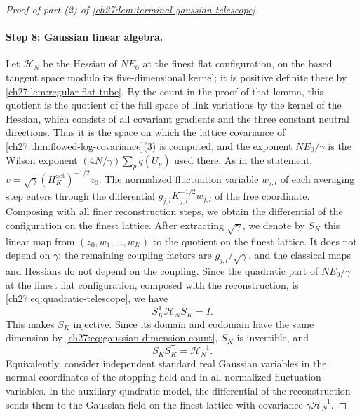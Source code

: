 \begin{proof}[Proof of part (2) of \cref{ch27:lem:terminal-gaussian-telescope}]
\paragraph{Step 8: Gaussian linear algebra.}
Let $\mathcal H_N$ be the Hessian of $NE_0$ at the finest flat configuration, on the based tangent space modulo its five-dimensional kernel; it is positive definite there by \cref{ch27:lem:regular-flat-tube}. By the count in the proof of that lemma, this quotient is the quotient of the full space of link variations by the kernel of the Hessian, which consists of all covariant gradients and the three constant neutral directions. Thus it is the space on which the lattice covariance of \cref{ch27:thm:flowed-log-covariance}(3) is computed, and the exponent $NE_0/\gamma$ is the Wilson exponent $(4N/\gamma)\sum_pq(U_p)$ used there. As in the statement, $v=\sqrt\gamma(H_K^{\mathrm{act}})^{-1/2}z_0$. The normalized fluctuation variable $w_{j,l}$ of each averaging step enters through the differential $g_{j,l}K_{j,l}^{-1/2}w_{j,l}$ of the free coordinate. Composing with all finer reconstruction steps, we obtain the differential of the configuration on the finest lattice. After extracting $\sqrt\gamma$, we denote by $S_K$ this linear map from $(z_0,w_1,\dots,w_K)$ to the quotient on the finest lattice. It does not depend on $\gamma$: the remaining coupling factors are $g_{j,l}/\sqrt\gamma$, and the classical maps and Hessians do not depend on the coupling. Since the quadratic part of $NE_0/\gamma$ at the finest flat configuration, composed with the reconstruction, is \eqref{ch27:eq:quadratic-telescope}, we have
\begin{equation}\label{ch27:eq:quadratic-isometry}
 S_K^{\mathsf T}\mathcal H_NS_K=I.
\end{equation}
This makes $S_K$ injective. Since its domain and codomain have the same dimension by \eqref{ch27:eq:gaussian-dimension-count}, $S_K$ is invertible, and
\[
 S_KS_K^{\mathsf T}=\mathcal H_N^{-1}.
\]
Equivalently, consider independent standard real Gaussian variables in the normal coordinates of the stopping field and in all normalized fluctuation variables. In the auxiliary quadratic model, the differential of the reconstruction sends them to the Gaussian field on the finest lattice with covariance $\gamma\mathcal H_N^{-1}$.


\end{proof}
